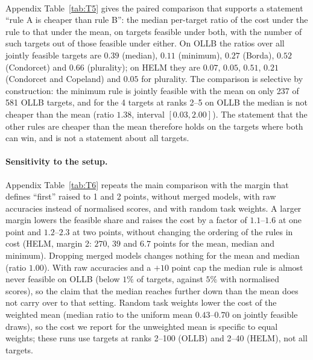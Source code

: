 \documentclass{article}
\begin{document}
\begin{table}[t]
\caption{Median investment to become first among feasible targets, by rank stratum and rule, primary caps: OLLB (\texttt{emp99}, top) and HELM (\texttt{emp99T}, bottom). ``feas.'' = feasible targets / targets in the stratum; $K$, $L_1$ with 95\% bootstrap intervals over targets; the last column is the median ratio of $L_1$ to the mean rule over targets feasible under both. OLLB Borda and Condorcet use the 50 best targets only. Generated by \texttt{figures/src/tables.py}.}
\label{tab:T3}
\centering\scriptsize
\resizebox{\linewidth}{!}{}\\[4pt]
\resizebox{\linewidth}{!}{}
\end{table}

Appendix Table~\ref{tab:T5} gives the paired comparison that supports a statement ``rule A is cheaper than rule B'': the median per-target ratio of the cost under the rule to that under the mean, on targets feasible under both, with the number of such targets out of those feasible under either. On OLLB the ratios over all jointly feasible targets are $0.39$ (median), $0.11$ (minimum), $0.27$ (Borda), $0.52$ (Condorcet) and $0.66$ (plurality); on HELM they are $0.07$, $0.05$, $0.51$, $0.21$ (Condorcet and Copeland) and $0.05$ for plurality. The comparison is selective by construction: the minimum rule is jointly feasible with the mean on only 237 of 581 OLLB targets, and for the 4 targets at ranks 2--5 on OLLB the median is not cheaper than the mean (ratio $1.38$, interval $[0.03, 2.00]$). The statement that the other rules are cheaper than the mean therefore holds on the targets where both can win, and is not a statement about all targets.

\paragraph{Sensitivity to the setup.}
Appendix Table~\ref{tab:T6} repeats the main comparison with the margin that defines ``first'' raised to 1 and 2 points, without merged models, with raw accuracies instead of normalised scores, and with random task weights. A larger margin lowers the feasible share and raises the cost by a factor of $1.1$--$1.6$ at one point and $1.2$--$2.3$ at two points, without changing the ordering of the rules in cost (HELM, margin 2: $270$, $39$ and $6.7$ points for the mean, median and minimum). Dropping merged models changes nothing for the mean and median (ratio $1.00$). With raw accuracies and a $+10$ point cap the median rule is almost never feasible on OLLB (below $1\%$ of targets, against $5\%$ with normalised scores), so the claim that the median reaches further down than the mean does not carry over to that setting. Random task weights lower the cost of the weighted mean (median ratio to the uniform mean $0.43$--$0.70$ on jointly feasible draws), so the cost we report for the unweighted mean is specific to equal weights; these runs use targets at ranks 2--100 (OLLB) and 2--40 (HELM), not all targets.
\end{document}
